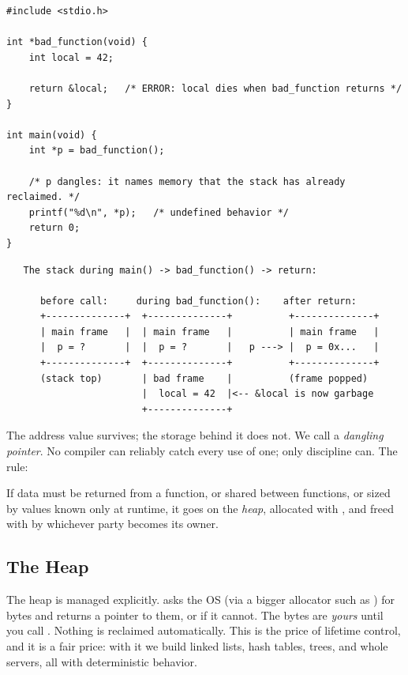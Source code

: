 \begin{lstlisting}[caption={A classic lifetime bug: returning a pointer to a stack local.}]
#include <stdio.h>

int *bad_function(void) {
    int local = 42;

    return &local;   /* ERROR: local dies when bad_function returns */
}

int main(void) {
    int *p = bad_function();

    /* p dangles: it names memory that the stack has already reclaimed. */
    printf("%d\n", *p);   /* undefined behavior */
    return 0;
}
\end{lstlisting}

\begin{verbatim}
   The stack during main() -> bad_function() -> return:

      before call:     during bad_function():    after return:
      +--------------+  +--------------+          +--------------+
      | main frame   |  | main frame   |          | main frame   |
      |  p = ?       |  |  p = ?       |   p ---> |  p = 0x...   |
      +--------------+  +--------------+          +--------------+
      (stack top)       | bad frame    |          (frame popped)
                        |  local = 42  |<-- &local is now garbage
                        +--------------+
\end{verbatim}

The address value survives; the storage behind it does not. We call
 a \emph{dangling pointer}. No compiler can reliably catch
every use of one; only discipline can. The rule:

\begin{ruleofthumb}
If data must be returned from a function, or shared between functions,
or sized by values known only at runtime, it goes on the \emph{heap},
allocated with , and freed with  by whichever
party becomes its owner.
\end{ruleofthumb}

\subsection{The Heap}

The heap is managed explicitly.  asks the OS (via a
bigger allocator such as ) for  bytes and
returns a pointer to them, or  if it cannot. The bytes are
\emph{yours} until you call . Nothing is reclaimed
automatically. This is the price of lifetime control, and it is a fair
price: with it we build linked lists, hash tables, trees, and whole
servers, all with deterministic behavior.

